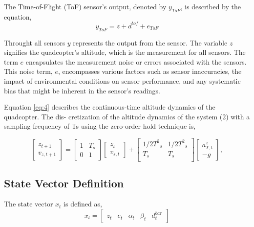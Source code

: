 \documentclass{article}
\begin{document}
\noindent
The Time-of-Flight (ToF) sensor's output, denoted by \( y_{ToF} \), is described by the equation,
\begin{equation}
y_{ToF} = z + d^{tof} + e_{ToF}
\end{equation}

\noindent
Throught all sensors \( y \) represents the output from the sensor. The variable \( z \) signifies the quadcopter's altitude, which is the measurement for all sensors. The term \( e \) encapsulates the measurement noise or errors associated with the sensors. This noise term, \( e \), encompasses various factors such as sensor inaccuracies, the impact of environmental conditions on sensor performance, and any systematic bias that might be inherent in the sensor's readings.

\noindent
Equation \eqref{eq:4} describes the continuous-time altitude dynamics of the quadcopter. The dis-
cretization of the altitude dynamics of the system (2) with a sampling frequency of Ts using the zero-order hold technique is,

\begin{equation}
\begin{bmatrix}
z_{t+1}\\
v_{z,t+1}
\end{bmatrix} =
\begin{bmatrix}
1 & T_s \\
0 & 1 
\end{bmatrix}
\begin{bmatrix}
z_t\\
v_{s,t}
\end{bmatrix} + 
\begin{bmatrix}
{1/2}{T^2}_s & {1/2}{T^2}_s \\
T_s & T_s \\ 
\end{bmatrix}
\begin{bmatrix}
a_{T,t}^z \\ 
-g
\end{bmatrix},
\end{equation}
\subsection{State Vector Definition}
The state vector \( x_t \) is defined as,
\[
    x_t = 
    \begin{bmatrix}
        z_t &
        e_{t} & 
        \alpha_t & 
        \beta_t &
        d^{bar}_t 
    \end{bmatrix}
\]
\end{document}
